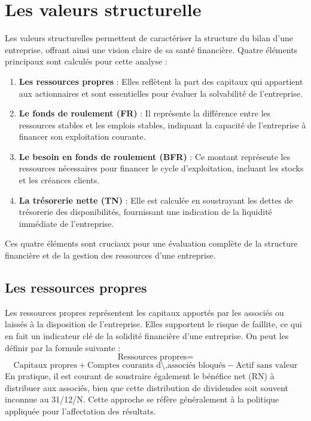 \documentclass[a4paper, 12pt]{report}
\begin{document}
\section{Les valeurs structurelle}

Les valeurs structurelles permettent de caractériser la structure du bilan d'une entreprise, offrant ainsi une vision claire de sa santé financière. Quatre éléments principaux sont calculés pour cette analyse :

\begin{enumerate}
	\item \textbf{Les ressources propres} : Elles reflètent la part des capitaux qui appartient aux actionnaires et sont essentielles pour évaluer la solvabilité de l'entreprise.
	\item \textbf{Le fonds de roulement (FR)} : Il représente la différence entre les ressources stables et les emplois stables, indiquant la capacité de l'entreprise à financer son exploitation courante.
	\item \textbf{Le besoin en fonds de roulement (BFR)} : Ce montant représente les ressources nécessaires pour financer le cycle d'exploitation, incluant les stocks et les créances clients.
	\item \textbf{La trésorerie nette (TN)} : Elle est calculée en soustrayant les dettes de trésorerie des disponibilités, fournissant une indication de la liquidité immédiate de l'entreprise.
\end{enumerate}

Ces quatre éléments sont cruciaux pour une évaluation complète de la structure financière et de la gestion des ressources d'une entreprise.

\subsection{Les ressources propres}

Les ressources propres représentent les capitaux apportés par les associés ou laissés à la disposition de l'entreprise. Elles supportent le risque de faillite, ce qui en fait un indicateur clé de la solidité financière d'une entreprise. On peut les définir par la formule suivante :
\[
\text{Ressources propres} = 
\]
\[ 
\text{Capitaux propres} + \text{Comptes courants d\'\,associés bloqués} - \text{Actif sans valeur}
\]
En pratique, il est courant de soustraire également le bénéfice net (RN) à distribuer aux associés, bien que cette distribution de dividendes soit souvent inconnue au 31/12/N. Cette approche se réfère généralement à la politique appliquée pour l'affectation des résultats.
\end{document}
